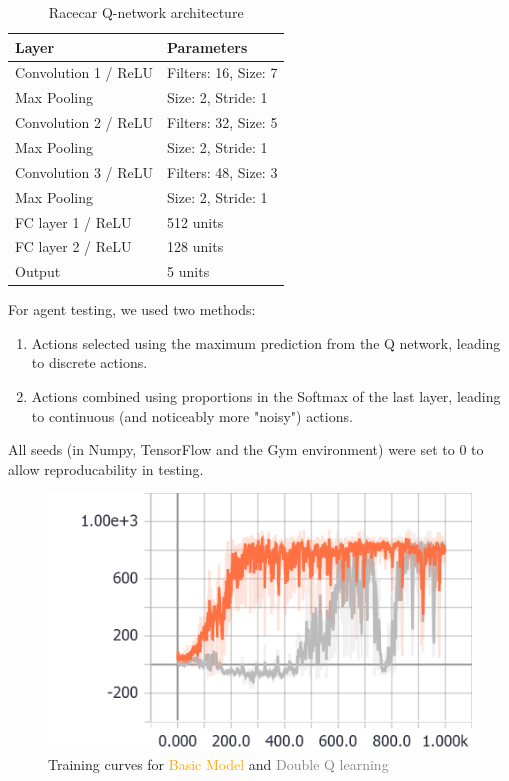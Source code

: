 \documentclass[a4paper, 11pt, conference]{ieeeconf}      %
\begin{document}
\begin{table}
  \centering
  \caption{Racecar Q-network architecture}
  \label{table:agent1}
  \begin{tabular}{ll}
  Layer & Parameters \\ \hline
  Convolution 1 / ReLU & Filters: 16, Size: 7 \\
  Max Pooling & Size: 2, Stride: 1\\
  Convolution 2 / ReLU & Filters: 32, Size: 5 \\
  Max Pooling & Size: 2, Stride: 1\\
  Convolution 3 / ReLU & Filters: 48, Size: 3 \\
  Max Pooling & Size: 2, Stride: 1\\
  FC layer 1 / ReLU & 512 units\\
  FC layer 2 / ReLU & 128 units\\
  Output & 5 units\\
  \end{tabular}
  \end{table}

For agent testing, we used two methods:

\begin{enumerate}
	\item Actions selected using the maximum prediction from the Q network, leading to discrete actions.
	\item Actions combined using proportions in the Softmax of the last layer, leading to continuous (and noticeably more "noisy") actions.
\end{enumerate}

All seeds (in Numpy, TensorFlow and the Gym environment) were set to 0 to allow reproducability in testing.

\begin{figure}
  \includegraphics[width=\linewidth]{figs/racecar_train_1.png}
  \caption{Training curves for \textcolor{orange}{Basic Model} and \textcolor{gray}{Double Q learning}}
  \label{fig:train1}
\end{figure}
\end{document}
